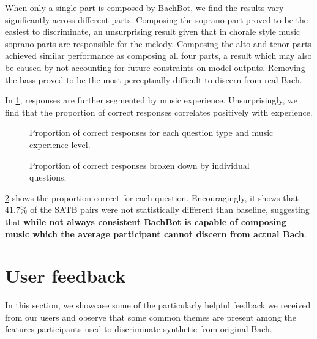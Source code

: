 When only a single part is composed by BachBot, we find the results vary significantly
across different parts. Composing the soprano part proved to be the easiest to
discriminate, an unsurprising result given that in chorale style music soprano parts
are responsible for the melody. Composing the alto and tenor parts achieved
similar performance as composing all four parts, a result which may also be caused by
not accounting for future constraints on model outputs. Removing the bass proved
to be the most perceptually difficult to discern from real Bach.

In \cref{fig:responses-mask-musicExperience}, responses are further segmented
by music experience. Unsurprisingly, we find that the proportion of correct responses
correlates positively with experience.

\begin{figure}[tb]
  \centering
  
  \caption{Proportion of correct responses for each question type and music experience level.}
  \label{fig:responses-mask-musicExperience}
\end{figure}

\begin{figure}[tb]
  \centering
  
  \caption{Proportion of correct responses broken down by individual questions.}
  \label{fig:responses-name}
\end{figure}

\cref{fig:responses-name} shows the proportion correct for each question.
Encouragingly, it shows that $41.7\%$ of the SATB pairs were not
statistically different than baseline, suggesting that \textbf{while not always
consistent BachBot is capable of composing music which the average participant
cannot discern from actual Bach}.


\section{User feedback}

In this section, we showcase some of the particularly helpful feedback we
received from our users and observe that some common themes are present
among the features participants used to discriminate synthetic from original Bach.

